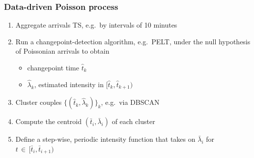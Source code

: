 \documentclass[table,aspectratio=169]{beamer}
\begin{document}
\begin{frame}[t]\frametitle{Data-driven Poisson process}
    \begin{enumerate}
        \item Aggregate arrivals TS, e.g.\ by intervals of 10 minutes
        \item Run a \alert{changepoint-detection} algorithm, e.g.\ PELT, under the null hypothesis of Poissonian arrivals to obtain
        \begin{itemize}
            \item changepoint time $\hat{t}_k$
            \item $\hat{\lambda}_k$, estimated intensity in $[\hat{t}_k, \hat{t}_{k+1})$
        \end{itemize}
        \item \alert{Cluster} couples $\{(\hat{t}_k, \hat{\lambda}_k)\}_k$, e.g.\ via DBSCAN
        \item Compute the \alert{centroid} $(\bar{t}_i, \bar{\lambda}_i)$ of each cluster
        \item Define a \alert{step-wise, periodic intensity function} that takes on $\bar{\lambda}_i$ for $t \,\in\, [\bar{t}_i, \bar{t}_{i+1})$
    \end{enumerate}
\end{frame}
%
%
%
%
\end{document}
